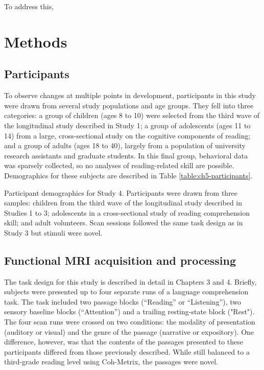 To address this, 

\section{Methods}

\subsection{Participants}

To observe changes at multiple points in development, participants in this study were drawn from several study populations and age groups. They fell into three categories: a group of children (ages 8 to 10) were selected from the third wave of the longitudinal study described in Study 1;  a group of adolescents (ages 11 to 14) from a large, cross-sectional study on the cognitive components of reading; and a group of adults (ages 18 to 40), largely from a population of university research assistants and graduate students. In this final group, behavioral data was sparsely collected, so no analyses of reading-related skill are possible. Demographics for these subjects are described in Table \ref{table:ch5-participants}.

\begin{table}[t]
	\renewcommand{\tabcolsep}{0.09cm}
	\centering
	
	\caption[Participant demographics for Study 4.]{Participant demographics for Study 4. Participants were drawn from three samples: children from the third wave of the longitudinal study described in Studies 1 to 3; adolescents in a cross-sectional study of reading comprehension skill; and adult volunteers. Scan sessions followed the same task design as in Study 3 but stimuli were novel.}
	\label{table:ch5-participants}
\end{table}

\subsection{Functional MRI acquisition and processing}

The task design for this study is described in detail in Chapters 3 and 4. Briefly, subjects were presented up to four separate runs of a language comprehension task. The task included two passage blocks (``Reading'' or ``Listening''), two sensory baseline blocks (``Attention'') and a trailing resting-state block ("Rest"). The four scan runs were crossed on two conditions: the modality of presentation (auditory or visual) and the genre of the passage (narrative or expository). One difference, however, was that the contents of the passages presented to these participants differed from those previously described. While still balanced to a third-grade reading level using Coh-Metrix, the passages were novel. 

